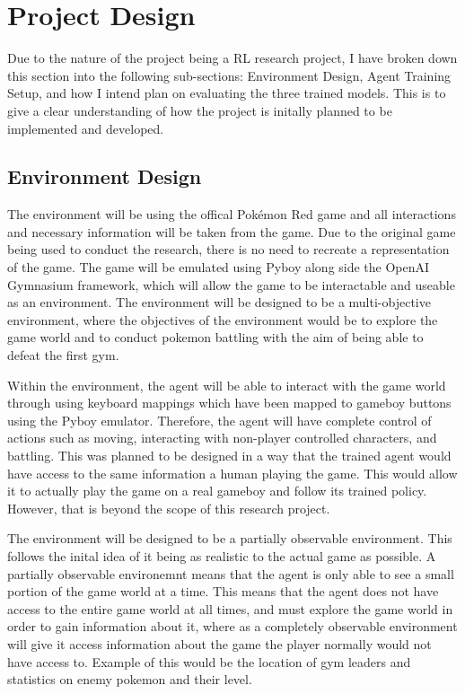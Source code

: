 \section{Project Design}

Due to the nature of the project being a RL research project, I have broken down this section into the following sub-sections: Environment Design, Agent Training Setup, and how I intend plan on evaluating the three trained models. This is to give a clear understanding of how the project is initally planned to be implemented and developed.

\subsection{Environment Design}

The environment will be using the offical Pokémon Red game and all interactions and necessary information will be taken from the game. Due to the original game being used to conduct the research, there is no need to recreate a representation of the game. The game will be emulated using Pyboy along side the OpenAI Gymnasium framework, which will allow the game to be interactable and useable as an environment. The environment will be designed to be a multi-objective environment, where the objectives of the environment would be to explore the game world and to conduct pokemon battling with the aim of being able to defeat the first gym. 

Within the environment, the agent will be able to interact with the game world through using keyboard mappings which have been mapped to gameboy buttons using the Pyboy emulator. Therefore, the agent will have complete control of actions such as moving, interacting with non-player controlled characters, and battling. This was planned to be designed in a way that the trained agent would have access to the same information a human playing the game. This would allow it to actually play the game on a real gameboy and follow its trained policy. However, that is beyond the scope of this research project.

The environment will be designed to be a partially observable environment. This follows the inital idea of it being as realistic to the actual game as possible. A partially observable environemnt means that the agent is only able to see a small portion of the game world at a time. This means that the agent does not have access to the entire game world at all times, and must explore the game world in order to gain information about it, where as a completely observable environment will give it access information about the game the player normally would not have access to. Example of this would be the location of gym leaders and statistics on enemy pokemon and their level. 


